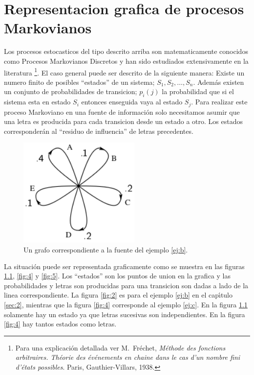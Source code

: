 \chapter{Representacion grafica de procesos Markovianos}
\label{sec:4}

Los procesos estocasticos del tipo descrito arriba son matematicamente
conocidos como Procesos Markovianos Discretos y han sido estudiados
extensivamente en la literatura \footnote{Para una explicaci\'{o}n
  detallada ver M.\ Fr\'{e}chet, {\em M\'{e}thode des fonctions
    arbitraires. Th\'{e}orie des \'{e}v\'{e}nements en chaine dans le
    cas d'un nombre fini d'\'{e}tats possibles}. Paris,
  Gauthier-Villars, 1938.}.  El caso general puede ser descrito de la
siguiente manera: Existe un numero finito de posibles ``estados'' de
un sistema; $S_{1}, S_{2}, \ldots, S_{n}$. Adem\'{a}s existen un
conjunto de probabilidades de transicion; $p_{i}(j)$ la probabilidad
que si el sistema esta en estado $S_{i}$ entonces enseguida vaya al
estado $S_{j}$. Para realizar este proceso Markoviano en una fuente de
informaci\'{o}n solo necesitamos asumir que una letra es producida
para cada transicion desde un estado a otro. Los estados
corresponder\'{a}n al ``residuo de influencia'' de letras precedentes.

\begin{figure}[!ht]
\centerline{\includegraphics[width=60mm]{Imagenes/SinComentarios/Pagina8-Figura3.png}}
\caption{Un grafo correspondiente a la fuente del ejemplo \ref{ej:b}.}
\label{fig:3}
\end{figure}

La situaci\'{o}n puede ser representada graficamente como se muestra
en las figuras \ref{fig:3}, \ref{fig:4} y \ref{fig:5}. Los ``estados''
son los puntos de union en la grafica y las probabilidades y letras
son producidas para una transicion son dadas a lado de la linea
correspondiente. La figura \ref{fig:2} es para el ejemplo \ref{ej:b}
en el cap\'{\i}tulo \ref{sec:2}, mientras que la figura \ref{fig:4}
corresponde al ejemplo \ref{ej:c}. En la figura \ref{fig:3} solamente
hay un estado ya que letras sucesivas son independientes. En la figura
\ref{fig:4} hay tantos estados como letras.

